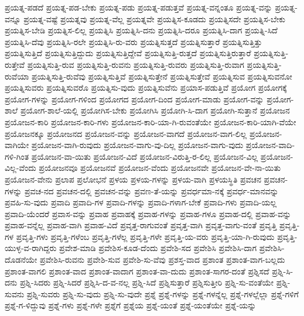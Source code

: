 {ಪ್ರಯತ್ನ-ಪಡದೆ
ಪ್ರಯತ್ನ-ಪಡ-ಬೇಕು
ಪ್ರಯತ್ನ-ಪಡು
ಪ್ರಯತ್ನ-ಪಡುತ್ತವೆ
ಪ್ರಯತ್ನ-ವನ್ನಂತೂ
ಪ್ರಯತ್ನ-ವನ್ನು
ಪ್ರಯತ್ನ-ವನ್ನೂ
ಪ್ರಯತ್ನ-ವಷ್ಟೆ
ಪ್ರಯತ್ನವು
ಪ್ರಯತ್ನ-ವೆಲ್ಲ
ಪ್ರಯತ್ನವೇ
ಪ್ರಯತ್ನಿಸ-ಕೂಡದು
ಪ್ರಯತ್ನಿಸದೇ
ಪ್ರಯತ್ನಿಸ-ಬೇಕು
ಪ್ರಯತ್ನಿಸ-ಬೇಡಿ
ಪ್ರಯತ್ನಿಸ-ಲಿಲ್ಲ
ಪ್ರಯತ್ನಿಸಿ
ಪ್ರಯತ್ನಿಸಿ-ದನು
ಪ್ರಯತ್ನಿಸಿ-ದರೂ
ಪ್ರಯತ್ನಿಸಿ-ದಾಗ
ಪ್ರಯತ್ನಿ-ಸಿದೆ
ಪ್ರಯತ್ನಿಸಿ-ದೆವು
ಪ್ರಯತ್ನಿಸಿ-ರಲೇ
ಪ್ರಯತ್ನಿಸಿ-ರು-ವರು
ಪ್ರಯತ್ನಿಸುತ್ತದೆ
ಪ್ರಯತ್ನಿಸುತ್ತಾರೆ
ಪ್ರಯತ್ನಿಸುತ್ತಿತ್ತು
ಪ್ರಯತ್ನಿಸುತ್ತಿದೆ
ಪ್ರಯತ್ನಿಸುತ್ತಿದ್ದುದು
ಪ್ರಯತ್ನಿಸುತ್ತಿದ್ದೇವೆ
ಪ್ರಯತ್ನಿಸುತ್ತಿ-ರುತ್ತದೆ
ಪ್ರಯತ್ನಿಸುತ್ತಿರುತ್ತಾರೆ
ಪ್ರಯತ್ನಿಸುತ್ತಿ-ರುತ್ತೇವೆ
ಪ್ರಯತ್ನಿಸುತ್ತಿ-ರುವ
ಪ್ರಯತ್ನಿಸುತ್ತಿ-ರುವನು
ಪ್ರಯತ್ನಿಸುತ್ತಿ-ರುವರು
ಪ್ರಯತ್ನಿಸುತ್ತಿ-ರುವಾಗ
ಪ್ರಯತ್ನಿಸುತ್ತಿ-ರುವೆಯಾ
ಪ್ರಯತ್ನಿಸುತ್ತಿ-ರುವೆವು
ಪ್ರಯತ್ನಿಸುತ್ತಿವೆ
ಪ್ರಯತ್ನಿಸುತ್ತೇನೆ
ಪ್ರಯತ್ನಿಸುತ್ತೇವೆ
ಪ್ರಯತ್ನಿಸುವ
ಪ್ರಯತ್ನಿಸುವನೋ
ಪ್ರಯತ್ನಿಸುವರು
ಪ್ರಯತ್ನಿಸುವರೊ
ಪ್ರಯತ್ನಿಸು-ವುದು
ಪ್ರಯತ್ನಿಸುವೆನು
ಪ್ರಯಾಸ-ಪಡುತ್ತಿವೆ
ಪ್ರಯೋಗ
ಪ್ರಯೋಗಕ್ಕೆ
ಪ್ರಯೋಗ-ಗಳನ್ನು
ಪ್ರಯೋಗ-ಗಳಿಂದ
ಪ್ರಯೋಗದ
ಪ್ರಯೋಗ-ದಿಂದ
ಪ್ರಯೋಗ-ಮಾಡು
ಪ್ರಯೋಗ-ವನ್ನು
ಪ್ರಯೋಗ-ಶಾಲೆ
ಪ್ರಯೋಗ-ಶಾಲೆ-ಯಲ್ಲಿ
ಪ್ರಯೋಗಿಸ-ಬೇಕು
ಪ್ರಯೋಗಿಸಿ
ಪ್ರಯೋಗಿ-ಸಿ-ದಾಗ
ಪ್ರಯೋಗಿ-ಸುತ್ತಾನೆ
ಪ್ರಯೋಜನ
ಪ್ರಯೋಜನ-ಕಾರಿ
ಪ್ರಯೋಜನ-ಕಾರಿ-ಗಳು
ಪ್ರಯೋಜನ-ಕಾರಿ-ಯಾ-ಗಿ-ರುವಂತೆಯೇ
ಪ್ರಯೋಜನ-ಕಾರಿ-ಯಾಗಿ-ವೆಯೇ
ಪ್ರಯೋಜನಕ್ಕೂ
ಪ್ರಯೋಜನದ
ಪ್ರಯೋಜನ-ವನ್ನು
ಪ್ರಯೋಜನ-ವಾಗದೆ
ಪ್ರಯೋಜನ-ವಾಗ-ಲಿಲ್ಲ
ಪ್ರಯೋಜನ-ವಾಗಿಯೇ
ಪ್ರಯೋಜನ-ವಾಗಿ-ರುವುದು
ಪ್ರಯೋಜನ-ವಾಗು-ವು-ದಿಲ್ಲ
ಪ್ರಯೋಜನ-ವಾಗು-ವುದು
ಪ್ರಯೋಜನ-ವಾದಿ-ಗಳಿ-ಗಿಂತ
ಪ್ರಯೋಜನ-ವಾ-ಯಿತು
ಪ್ರಯೋಜನ-ವಿದೆ
ಪ್ರಯೋಜನ-ವಿರುತ್ತಿ-ರ-ಲಿಲ್ಲ
ಪ್ರಯೋಜನ-ವಿಲ್ಲ
ಪ್ರಯೋಜನ-ವಿಲ್ಲ-ವೆಂದು
ಪ್ರಯೋಜನವೂ
ಪ್ರಯೋಜನವೆ
ಪ್ರಯೋಜನ-ವೆಂದು
ಪ್ರಯೋಜನವೇ
ಪ್ರಯೋಜನ-ವೇ-ನಾ-ಯಿತು
ಪ್ರಯೋಜನ-ವೇನು
ಪ್ರಲಾಪ
ಪ್ರಲೋಭನೆ
ಪ್ರಳಯ
ಪ್ರಳಯ-ಗಳನ್ನು
ಪ್ರಳಯ-ವಾಗಿ
ಪ್ರಳಯಸ್ಥಿತಿ
ಪ್ರವಚನ
ಪ್ರವಚನ-ಗಳನ್ನು
ಪ್ರವಚ-ನದ
ಪ್ರವಚನ-ದಲ್ಲಿ
ಪ್ರವಚನ-ವನ್ನು
ಪ್ರವಣ-ತೆ-ಯನ್ನು
ಪ್ರವರ್ಧಮಾ-ನಕ್ಕೆ
ಪ್ರವರ್ಧ-ಮಾನವನ್ನು
ಪ್ರವಹಿ-ಸು-ವುದು
ಪ್ರವಾದಿ
ಪ್ರವಾದಿ-ಗಳ
ಪ್ರವಾದಿ-ಗಳನ್ನು
ಪ್ರವಾದಿ-ಗಳಾಗ-ಬೇಕೆ
ಪ್ರವಾದಿ-ಗಳು
ಪ್ರವಾದಿ-ಯಲ್ಲ
ಪ್ರವಾದಿ-ಯೆಂದರೆ
ಪ್ರವಾಸ-ವನ್ನು
ಪ್ರವಾಹ
ಪ್ರವಾಹಕ್ಕೆ
ಪ್ರವಾಹ-ಗಳನ್ನು
ಪ್ರವಾಹ-ಗಳೂ
ಪ್ರವಾಹ-ದಲ್ಲಿ
ಪ್ರವಾಹ-ವನ್ನು
ಪ್ರವಾಹ-ವನ್ನೆಲ್ಲ
ಪ್ರವಾಹ-ವಾಗಿ
ಪ್ರವಾಹ-ವಿದೆ
ಪ್ರವೃತ್ತ-ರಾಗುವಂತೆ
ಪ್ರವೃತ್ತ-ವಾಗಿ
ಪ್ರವೃತ್ತ-ವಾಗು-ವಂತೆ
ಪ್ರವೃತ್ತಿ
ಪ್ರವೃತ್ತಿ-ಗಳ
ಪ್ರವೃತ್ತಿ-ಗಳು
ಪ್ರವೃತ್ತಿ-ಗಳೆಂಬ
ಪ್ರವೃತ್ತಿ-ಗಳೆಲ್ಲ
ಪ್ರವೃತ್ತಿ-ಗಳೇ
ಪ್ರವೃತ್ತಿ-ಯ-ವರು
ಪ್ರವೃತ್ತಿ-ಯಾ-ಗಿ-ರುವುದು
ಪ್ರವೃತ್ತಿ-ಯುಳ್ಳ-ವ-ರಾಗಿದ್ದರು
ಪ್ರವೇಶ-ಮಾಡಿ
ಪ್ರವೇಶಿಸ-ಕೂಡ-ದೆಂದು
ಪ್ರವೇಶಿ-ಸದ
ಪ್ರವೇಶಿಸಿ
ಪ್ರವೇಶಿಸಿ-ದಾಗ
ಪ್ರವೇಶಿಸಿ-ದೊಡನೆಯೇ
ಪ್ರವೇಶಿಸಿ-ರುವನು
ಪ್ರವೇಶಿ-ಸುವ
ಪ್ರವೇಶಿ-ಸು-ವೆವು
ಪ್ರಶಸ್ತ-ವಾದ
ಪ್ರಶಾಂತ
ಪ್ರಶಾಂತ-ವಾಗ-ಬಲ್ಲದು
ಪ್ರಶಾಂತ-ವಾಗಲಿ
ಪ್ರಶಾಂತ-ವಾದ
ಪ್ರಶಾಂತ-ವಾದಾಗ
ಪ್ರಶಾಂತ-ವಾ-ದುದು
ಪ್ರಶಾಂತ-ಸಾಗರ-ದಂತೆ
ಪ್ರಶ್ನಿಸದೆ
ಪ್ರಶ್ನಿ-ಸಿ-ದನು
ಪ್ರಶ್ನಿ-ಸಿದರು
ಪ್ರಶ್ನಿ-ಸಿದರೆ
ಪ್ರಶ್ನಿಸಿ-ದ-ವ-ನಲ್ಲ
ಪ್ರಶ್ನಿ-ಸಿದೆ
ಪ್ರಶ್ನಿಸುತ್ತಾರೆ
ಪ್ರಶ್ನಿಸುತ್ತೀರಿ
ಪ್ರಶ್ನಿ-ಸು-ವಂತೆಯೇ
ಪ್ರಶ್ನಿ-ಸುವನು
ಪ್ರಶ್ನಿ-ಸುವರು
ಪ್ರಶ್ನಿ-ಸು-ವುದು
ಪ್ರಶ್ನಿ-ಸು-ವುದೇ
ಪ್ರಶ್ನೆ
ಪ್ರಶ್ನೆ-ಗಳನ್ನು
ಪ್ರಶ್ನೆ-ಗಳನ್ನೆಲ್ಲ
ಪ್ರಶ್ನೆ-ಗಳಲ್ಲೆಲ್ಲಾ
ಪ್ರಶ್ನೆ-ಗಳಿಗೆ
ಪ್ರಶ್ನೆ-ಗ-ಳಿದ್ದುವು
ಪ್ರಶ್ನೆ-ಗಳು
ಪ್ರಶ್ನೆ-ಗಳೇ
ಪ್ರಶ್ನೆಗೆ
ಪ್ರಶ್ನೆಯ
ಪ್ರಶ್ನೆ-ಯಂತೆ
ಪ್ರಶ್ನೆ-ಯಂತೆಯೇ
ಪ್ರಶ್ನೆ-ಯನ್ನು
}

